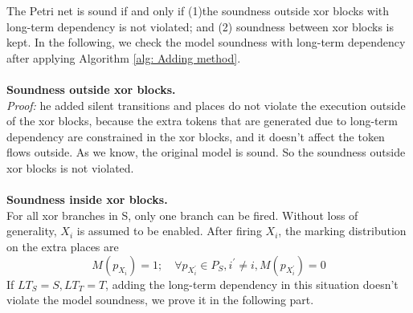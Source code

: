The Petri net is sound if and only if (1)the soundness outside xor blocks with long-term dependency is not violated; and  (2) soundness between xor blocks is kept. In the following, we check the model soundness with long-term dependency after applying Algorithm \ref{alg: Adding method}. \\\\
\textbf{Soundness outside xor blocks.}\\
	\emph{Proof:} he added silent transitions and places do not violate the execution outside of the xor blocks, because the extra tokens that are generated due to long-term dependency are constrained in the xor blocks, and it doesn't affect the token flows outside. As we know, the original model is sound. So the soundness outside xor blocks is not violated.
\\\\
\textbf{Soundness inside xor blocks.}\\
For all xor branches in S, only one branch can be fired. Without loss of generality, $X_i$ is assumed to be enabled. After firing $X_i$, the marking distribution on the extra places are  
\[ M(p_{X_i}) = 1; \quad 
\forall p_{X_i^\prime} \in P_S, i^\prime \neq i, M(p_{X_i^\prime})=0 \]
If $ LT_S = S, LT_T=T$, adding the long-term dependency in this situation doesn't violate the model soundness, we prove it in the following part.
